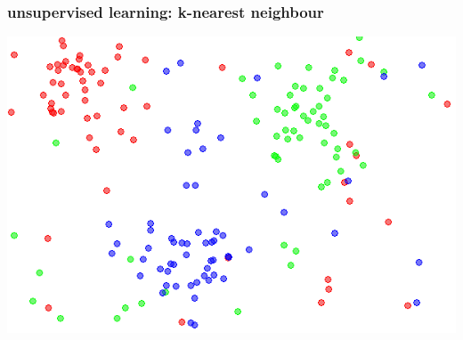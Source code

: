 \documentclass[USenglish,pdftex,compress,10pt,svgnamesi]{beamer}%
\begin{document}
%
%
%
%
%
%
%
%
%
%



%
%
%




\begin{frame}
\frametitle{unsupervised learning: k-nearest neighbour}

 \includegraphics[width=\textwidth]{knn}

\end{frame}
\end{document}
